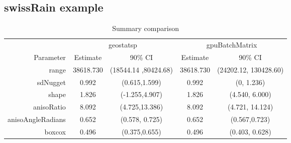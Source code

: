 \documentclass{article}\usepackage[]{graphicx}\usepackage[]{color}
\newenvironment{knitrout}{}{} %
\def\T{{\footnotesize {^{_{\sf T}}}}}
\begin{document}
% 






\subsection{swissRain example}


\begin{knitrout}
\color{fgcolor}\begin{table}[H]

\caption{\label{tab:swisssummarycompare}Summary comparison}
\centering
\begin{tabular}[t]{rcccc}
\toprule
\multicolumn{1}{c}{ } & \multicolumn{2}{c}{geostatsp} & \multicolumn{2}{c}{gpuBatchMatrix} \\
\cmidrule(l{3pt}r{3pt}){2-3} \cmidrule(l{3pt}r{3pt}){4-5}
Parameter & Estimate & 90\% CI & Estimate & 90\% CI\\
\midrule
range & 38618.730 & (18544.14 ,80424.68) & 38618.730 & (24202.12, 130428.60)\\
sdNugget & 0.992 & (0.615,1.599) & 0.992 & (0, 1.236)\\
shape & 1.826 & (-1.255,4.907) & 1.826 & (4.540, 6.000)\\
anisoRatio & 8.092 & (4.725,13.386) & 8.092 & (4.721, 14.124)\\
anisoAngleRadians & 0.652 & (0.578, 0.725) & 0.652 & (0.567,0.723)\\
boxcox & 0.496 & (0.375,0.655) & 0.496 & (0.403, 0.628)\\
\bottomrule
\end{tabular}
\end{table}

\end{knitrout}
\end{document}
